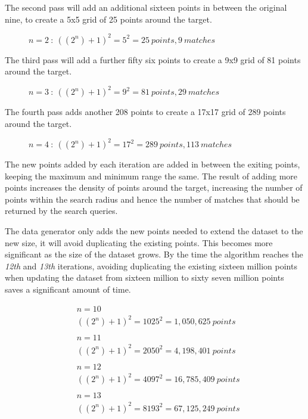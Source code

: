 \documentclass{article}
\newcommand{\dataset} {dataset\xspace}
\begin{document}
The second pass will add an additional sixteen points in between the original nine, to create a 5x5 grid of 25 points around the target. 
\begin{figure}[h]

\caption{$n=2 \ :\ ((2^n)+1)^2 = 5^2 = 25 \ points, 9 \ matches$}
\label{fig:data-count-03}
\end{figure}

The third pass will add a further fifty six points to create a 9x9 grid of 81 points around the target. 
\begin{figure}[h]

\caption{$n=3 \ :\ ((2^n)+1)^2 = 9^2 = 81 \ points, 29 \ matches$}
\label{fig:data-count-03}
\end{figure}

The fourth pass adds another 208 points to create a 17x17 grid of 289 points around the target. \begin{figure}[h]

\caption{$n=4 \ :\ ((2^n)+1)^2 = 17^2 = 289 \ points, 113 \ matches$}
\label{fig:data-count-04}
\end{figure}

The new points added by each iteration are added in between the exiting points, keeping the maximum and minimum range the same. The result of adding more points increases the density of points around the target, increasing the number of points within the search radius and hence the number of matches that should be returned by the search queries.

The data generator only adds the new points needed to extend the \dataset to the new size, it will avoid duplicating the existing points.
This becomes more significant as the size of the \dataset grows. By the time the algorithm reaches the \textit{12th} and \textit{13th} iterations, avoiding duplicating the existing sixteen million points when updating the \dataset from sixteen million to sixty seven million points saves a significant amount of time.

\begin{equation*}
\begin{split}
& n = 10\\
& ((2^n)+1)^2 = 1025^2 = 1,050,625 \ points
\\
\\
& n = 11\\
& ((2^n)+1)^2 = 2050^2 = 4,198,401 \ points
\\
\\
& n = 12\\
& ((2^n)+1)^2 = 4097^2 = 16,785,409 \ points
\\
\\
& n = 13\\
& ((2^n)+1)^2 = 8193^2 = 67,125,249 \ points
\end{split}
\end{equation*}
\end{document}
